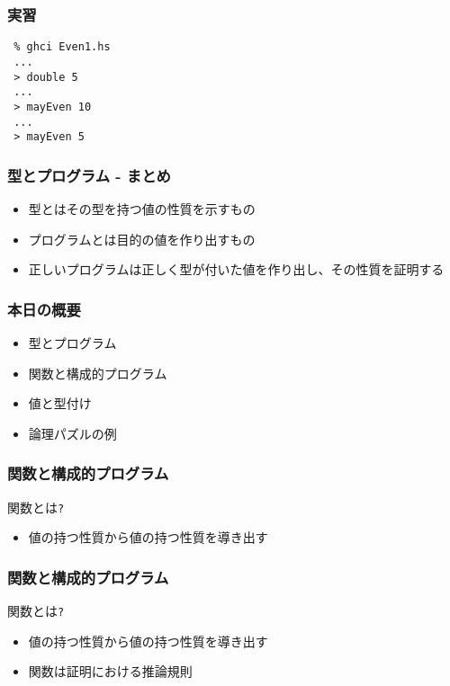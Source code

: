 \documentclass[cjk,dvipdfm,14pt]{beamer}
\begin{document}
\begin{frame}[fragile]
\frametitle{実習}

\begin{lstlisting}
 % ghci Even1.hs
 ...
 > double 5
 ...
 > mayEven 10
 ...
 > mayEven 5
\end{lstlisting}

\end{frame}

\begin{frame}[fragile]
\frametitle{型とプログラム - まとめ}

\begin{itemize}
\item 型とはその型を持つ値の性質を示すもの
\item プログラムとは目的の値を作り出すもの
\item 正しいプログラムは正しく型が付いた値を作り出し、その性質を証明する
\end{itemize}

\end{frame}

\begin{frame}[fragile]
\frametitle{本日の概要}

\begin{itemize}
\item 型とプログラム
\item { \color{red} 関数と構成的プログラム }
\item 値と型付け
\item 論理パズルの例
\end{itemize}

\end{frame}

\begin{frame}[fragile]
\frametitle{関数と構成的プログラム}

関数とは\verb|?|
\begin{itemize}
\item { \color{red} 値の持つ性質から値の持つ性質を導き出す}
\end{itemize}

\end{frame}

\begin{frame}[fragile]
\frametitle{関数と構成的プログラム}

関数とは\verb|?|
\begin{itemize}
\item 値の持つ性質から値の持つ性質を導き出す
\item { \color{red} 関数は証明における推論規則 }
\end{itemize}

\end{frame}
\end{document}
